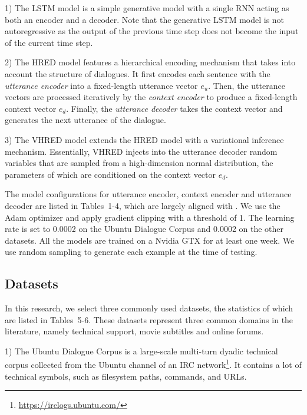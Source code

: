 \documentclass[conference]{IEEEtran}
\begin{document}
1) The LSTM model is a simple generative model with a single RNN acting as both an encoder and a decoder.
Note that the generative LSTM model is not autoregressive as the output of the previous time step does not become the input of the current time step.

2) The HRED model \cite{hred-qs,HRED} features a hierarchical encoding mechanism that takes into account the structure of dialogues.
It first encodes each sentence with the \emph{utterance encoder} into a fixed-length utterance vector $e_u$. Then, the utterance vectors are processed iteratively by the \emph{context encoder} to produce a fixed-length context vector $e_d$.
Finally, the \emph{utterance decoder} takes the context vector and generates the next utterance of the dialogue.

3) The VHRED model \cite{VHRED} extends the HRED model with a variational inference mechanism.
Essentially, VHRED injects into the utterance decoder random variables that are sampled from a high-dimension normal distribution, the parameters of which are conditioned on the context vector $e_d$.

The model configurations for utterance encoder, context encoder and utterance decoder are listed in Tables~1-4, which are largely aligned with \cite{VHRED}.
We use the Adam optimizer \cite{AdamOpt} and apply gradient clipping with a threshold of 1.
The learning rate is set to 0.0002 on the Ubuntu Dialogue Corpus and 0.0002 on the other datasets.
All the models are trained on a Nvidia GTX for at least one week.
We use random sampling to generate each example at the time of testing.


\subsection{Datasets}
In this research, we select three commonly used datasets, the statistics of which are listed in Tables~5-6.
These datasets represent three common domains in the literature, namely technical support, movie subtitles and online forums.


1) The Ubuntu Dialogue Corpus \cite{ubuntu_corpus} is a large-scale multi-turn dyadic technical corpus collected from the Ubuntu channel of an IRC network\footnote{\url{https://irclogs.ubuntu.com/}}.
It contains a lot of technical symbols, such as filesystem paths, commands, and URLs.
\end{document}

